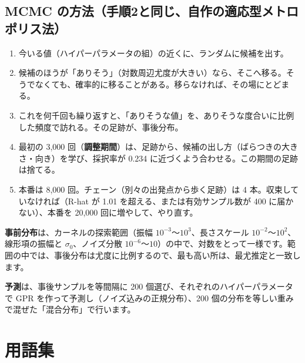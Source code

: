 \documentclass[paper=a4paper,fontsize=10.5pt,line_length=44zw,number_of_lines=38]{jlreq}
\begin{document}
\subsection{MCMC の方法（手順2と同じ、自作の適応型メトロポリス法）}
\begin{enumerate}[itemsep=0.4ex,topsep=0.5ex]
\item 今いる値（ハイパーパラメータの組）の近くに、ランダムに候補を出す。
\item 候補のほうが「ありそう」（対数周辺尤度が大きい）なら、そこへ移る。そうでなくても、確率的に移ることがある。移らなければ、その場にとどまる。
\item これを何千回も繰り返すと、「ありそうな値」を、ありそうな度合いに比例した頻度で訪れる。その足跡が、事後分布。
\item 最初の 3,000 回（\textbf{調整期間}）は、足跡から、候補の出し方（ばらつきの大きさ・向き）を学び、採択率が 0.234 に近づくよう合わせる。この期間の足跡は捨てる。
\item 本番は 8,000 回。チェーン（別々の出発点から歩く足跡）は 4 本。収束していなければ（R-hat が 1.01 を超える、または有効サンプル数が 400 に届かない）、本番を 20,000 回に増やして、やり直す。
\end{enumerate}

\textbf{事前分布}は、カーネルの探索範囲（振幅 $10^{-3}$〜$10^{3}$、長さスケール $10^{-2}$〜$10^{2}$、線形項の振幅と $\sigma_0$、ノイズ分散 $10^{-6}$〜$10$）の中で、対数をとって一様です。範囲の中では、事後分布は尤度に比例するので、最も高い所は、最尤推定と一致します。

\textbf{予測}は、事後サンプルを等間隔に 200 個選び、それぞれのハイパーパラメータで GPR を作って予測し（ノイズ込みの正規分布）、200 個の分布を等しい重みで混ぜた「混合分布」で行います。

\section{用語集}
\end{document}
